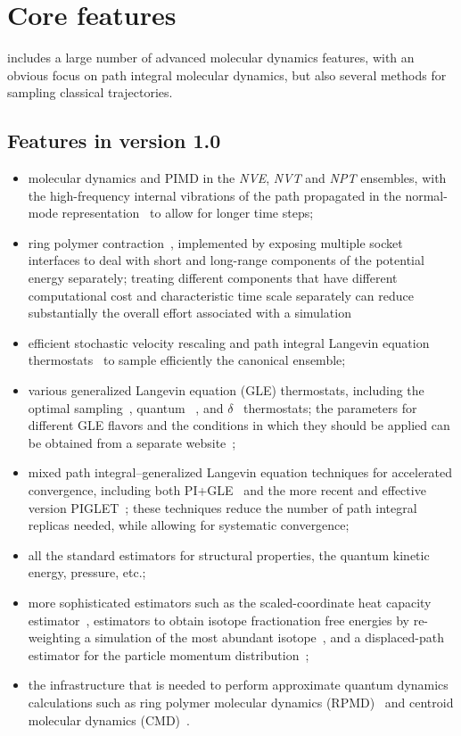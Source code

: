 \documentclass[11pt,english,fleqn]{report}
\begin{document}
\section{Core features}

\ipi{} includes a large number of advanced molecular dynamics features, with an obvious focus on path integral molecular dynamics, but also several methods for sampling classical trajectories.

\subsection{Features in version 1.0}
\begin{itemize}
\item molecular dynamics and PIMD in the {\em NVE}, {\em NVT} and {\em NPT} ensembles, with the high-frequency internal vibrations of the path propagated in the normal-mode representation~\cite{ceri+10jcp} {to allow for longer time steps};
\item ring polymer contraction~\cite{mark-mano08jcp,mark-mano08cpl}, implemented
by exposing multiple socket interfaces to deal with short and long-range components of the potential energy separately; {treating different components that have different computational cost and characteristic time scale separately can reduce substantially the overall effort associated with a simulation}
\item efficient stochastic velocity rescaling \cite{buss+07jcp} and
path integral Langevin equation thermostats~\cite{ceri+10jcp} {to sample efficiently the canonical ensemble};
\item various generalized Langevin equation (GLE) thermostats,
including the optimal sampling~\cite{ceri+09prl,ceri+10jctc}, quantum
~\cite{ceri+09prl2}, and $\delta$~\cite{ceri-parr10pcs} thermostats; the parameters
{for different GLE flavors and the conditions in which they should be applied can be obtained from a separate website~\cite{gle4md};}
\item mixed path integral--generalized Langevin equation techniques for
accelerated convergence, including both PI+GLE~\cite{ceri+11jcp} and the
more recent and effective version PIGLET~\cite{ceri-mano12prl}; {these techniques reduce the number of path integral replicas needed, while allowing for systematic convergence;}
\item all the standard estimators for structural properties, the quantum
kinetic energy, pressure, etc.;
\item more sophisticated estimators such as the scaled-coordinate
heat capacity estimator~\cite{yama05jcp},
estimators to obtain isotope fractionation free energies by re-weighting a
simulation of the most abundant isotope~\cite{ceri-mark13jcp}, and
a displaced-path estimator for the particle momentum distribution~\cite{lin+10prl};
\item the infrastructure that is needed to perform approximate quantum dynamics calculations such as ring polymer molecular dynamics (RPMD)~\cite{crai-mano04jcp,habe+13arpc} and centroid molecular dynamics
(CMD)~\cite{cao-voth93jcp,cao-voth94jcp}.
\end{itemize}
\end{document}
